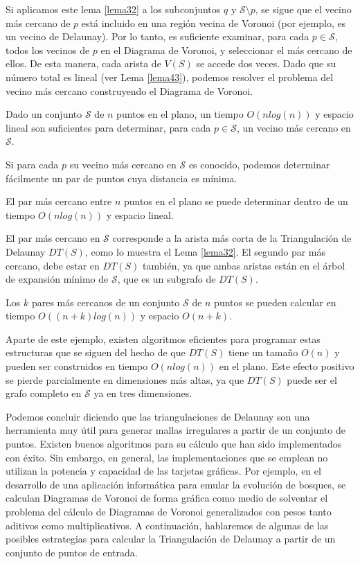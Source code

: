 Si aplicamos este lema \ref{lema32} a los subconjuntos ${q}$ y $\mathcal{S}\setminus{p}$, se sigue que el vecino más cercano de $p$ está incluido en una región vecina de Voronoi (por ejemplo, es un vecino de Delaunay). Por lo tanto, es suficiente examinar, para cada $p \in \mathcal{S}$, todos los vecinos de $p$ en el Diagrama de Voronoi, y seleccionar el más cercano de ellos. De esta manera, cada arista de $V(S)$ se accede dos veces. Dado que su número total es lineal (ver Lema \ref{lema43}), podemos resolver el problema del vecino más cercano construyendo el Diagrama de Voronoi.

\begin{teorema}
    Dado un conjunto $\mathcal{S}$ de $n$ puntos en el plano, un tiempo $O(nlog(n))$ y espacio lineal son suficientes para determinar, para cada $p \in \mathcal{S}$, un vecino más cercano en $\mathcal{S}$.
\end{teorema}
 
 
Si para cada $p$ su vecino más cercano en $\mathcal{S}$ es conocido, podemos determinar fácilmente un par de puntos cuya distancia es mínima.

\begin{corolario}
    El par más cercano entre $n$  puntos en el plano se puede determinar dentro de un tiempo $O(nlog(n))$ y espacio lineal.
\end{corolario}


El par más cercano en $\mathcal{S}$ corresponde a la arista más corta de la Triangulación de Delaunay $DT(S)$, como lo muestra el Lema \ref{lema32}. El segundo par más cercano, debe estar en $DT(S)$ también, ya que ambas aristas están en el árbol de expansión mínimo de $\mathcal{S}$, que es un subgrafo de $DT(S)$.

\begin{teorema}
    Los $k$ pares más cercanos de un conjunto $\mathcal{S}$ de $n$ puntos se pueden calcular en tiempo $O((n+k)log(n))$ y espacio $O(n+k)$.
\end{teorema}

Aparte de este ejemplo, existen algoritmos eficientes para programar estas estructuras que se siguen del hecho de que $DT(S)$ tiene un tamaño $O(n)$ y pueden ser construidos en tiempo $O(nlog(n))$ en el plano. Este efecto positivo se pierde parcialmente en dimensiones más altas, ya que $DT(S)$ puede ser el grafo completo en $\mathcal{S}$ ya en tres dimensiones. 
\vspace{0.3cm}


Podemos concluir diciendo que las triangulaciones de Delaunay son una herramienta muy útil para generar mallas irregulares a partir de un conjunto de puntos. Existen buenos algoritmos para su cálculo que han sido implementados con éxito. Sin embargo, en general, las implementaciones que se emplean no utilizan la potencia y capacidad de las tarjetas gráficas. Por ejemplo, en el desarrollo de una aplicación informática para emular la evolución de bosques, se calculan Diagramas de Voronoi de forma gráfica como medio de solventar el problema del cálculo de Diagramas de Voronoi generalizados con pesos tanto aditivos como multiplicativos. A continuación, hablaremos de algunas de las posibles estrategias para calcular la Triangulación de Delaunay a partir de un conjunto de puntos de entrada. 

